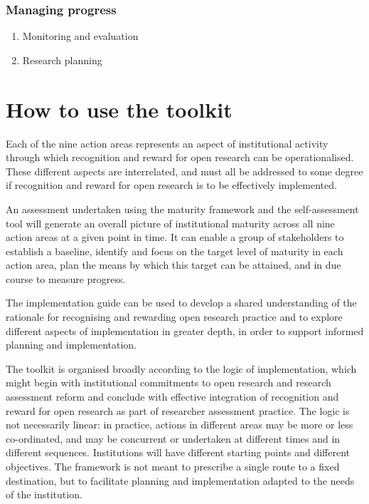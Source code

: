 \documentclass[
]{report}
\providecommand{\tightlist}{%
  \setlength{\itemsep}{0pt}\setlength{\parskip}{0pt}}\usepackage{longtable,booktabs,array}
\begin{document}
\subsubsection{Managing progress}\label{managing-progress}

\begin{enumerate}
\def\labelenumi{\arabic{enumi}.}
\setcounter{enumi}{7}
\tightlist
\item
  Monitoring and evaluation
\item
  Research planning
\end{enumerate}

\section{How to use the toolkit}\label{how-to-use-the-toolkit}

Each of the nine action areas represents an aspect of institutional
activity through which recognition and reward for open research can be
operationalised. These different aspects are interrelated, and must all
be addressed to some degree if recognition and reward for open research
is to be effectively implemented.

An assessment undertaken using the maturity framework and the
self-assessment tool will generate an overall picture of institutional
maturity across all nine action areas at a given point in time. It can
enable a group of stakeholders to establish a baseline, identify and
focus on the target level of maturity in each action area, plan the
means by which this target can be attained, and in due course to measure
progress.

The implementation guide can be used to develop a shared understanding
of the rationale for recognising and rewarding open research practice
and to explore different aspects of implementation in greater depth, in
order to support informed planning and implementation.

The toolkit is organised broadly according to the logic of
implementation, which might begin with institutional commitments to open
research and research assessment reform and conclude with effective
integration of recognition and reward for open research as part of
researcher assessment practice. The logic is not necessarily linear: in
practice, actions in different areas may be more or less co-ordinated,
and may be concurrent or undertaken at different times and in different
sequences. Institutions will have different starting points and
different objectives. The framework is not meant to prescribe a single
route to a fixed destination, but to facilitate planning and
implementation adapted to the needs of the institution.
\end{document}
